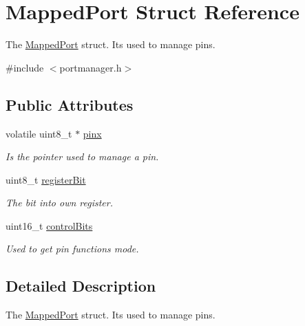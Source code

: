 \hypertarget{structMappedPort}{}\section{Mapped\+Port Struct Reference}
\label{structMappedPort}


The \hyperlink{structMappedPort}{Mapped\+Port} struct. It\textquotesingle{}s used to manage pins.  




{\ttfamily \#include $<$portmanager.\+h$>$}

\subsection*{Public Attributes}
\begin{DoxyCompactItemize}
\item 
\mbox{\label{structMappedPort_a504fc8fe2e91d886ed39d36a3c4e40f8}} 
volatile uint8\+\_\+t $\ast$ \hyperlink{structMappedPort_a504fc8fe2e91d886ed39d36a3c4e40f8}{pinx}
\begin{DoxyCompactList}\small\item\em Is the pointer used to manage a pin. \end{DoxyCompactList}\item 
\mbox{\label{structMappedPort_a5a906790bc9881785c9c166c8591dfc2}} 
uint8\+\_\+t \hyperlink{structMappedPort_a5a906790bc9881785c9c166c8591dfc2}{register\+Bit}
\begin{DoxyCompactList}\small\item\em The bit into own register. \end{DoxyCompactList}\item 
uint16\+\_\+t \hyperlink{structMappedPort_ae73f042b9d9a8a1a87d489525a2ca947}{control\+Bits}
\begin{DoxyCompactList}\small\item\em Used to get pin functions mode. \end{DoxyCompactList}\end{DoxyCompactItemize}


\subsection{Detailed Description}
The \hyperlink{structMappedPort}{Mapped\+Port} struct. It\textquotesingle{}s used to manage pins. 

